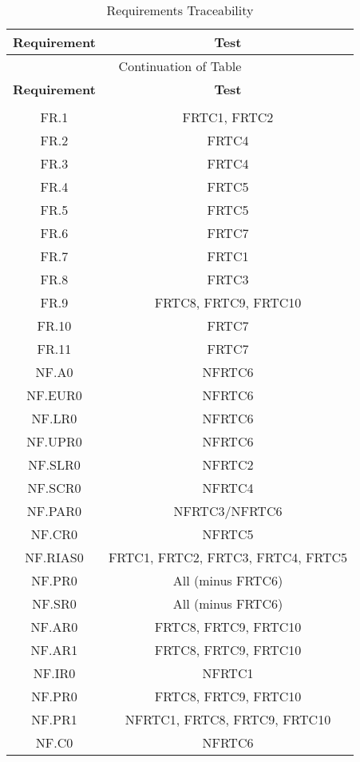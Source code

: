 \documentclass[12pt, titlepage]{article}
\begin{document}
\begin{longtable}[H] {|c|c|}
\hline
\textbf{Requirement} & \textbf{Test} \\
\hline
\endfirsthead

\hline
\multicolumn{2}{|c|}{Continuation of Table}\\
\hline
\textbf{Requirement} & \textbf{Test} \\
\hline
\endhead

\hline
\endfoot

\hline
\multicolumn{2}{| c |}{End of Table}\\
\hline
\caption{Requirements Traceability}
\label{tab:Traceability}
\endlastfoot


FR.1 & FRTC1, FRTC2\\
FR.2 & FRTC4\\
FR.3 & FRTC4\\
FR.4 & FRTC5\\
FR.5 & FRTC5\\
FR.6 & FRTC7\\
FR.7 & FRTC1\\
FR.8 & FRTC3\\
FR.9 & FRTC8, FRTC9, FRTC10\\
FR.10 & FRTC7\\
FR.11 & FRTC7\\

\pagebreak
NF.A0 & NFRTC6 \\
NF.EUR0 & NFRTC6 \\
NF.LR0 & NFRTC6 \\
NF.UPR0 & NFRTC6 \\
NF.SLR0 & NFRTC2 \\ 
NF.SCR0 & NFRTC4 \\
NF.PAR0 & NFRTC3/NFRTC6 \\
NF.CR0 & NFRTC5 \\
NF.RIAS0 & FRTC1, FRTC2, FRTC3, FRTC4, FRTC5\\
NF.PR0 & All (minus FRTC6) \\
NF.SR0 & All (minus FRTC6) \\ 
NF.AR0 & FRTC8, FRTC9, FRTC10 \\
NF.AR1 & FRTC8, FRTC9, FRTC10 \\
NF.IR0 & NFRTC1 \\
NF.PR0 & FRTC8, FRTC9, FRTC10 \\
NF.PR1 & NFRTC1, FRTC8, FRTC9, FRTC10 \\
NF.C0 & NFRTC6 \\

\end{longtable}
\end{document}
